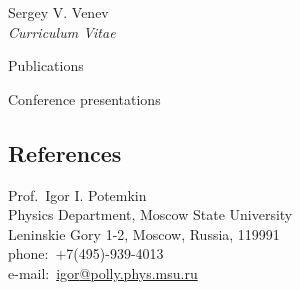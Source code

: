 \documentclass[10pt]{article}
\begin{document}
\begin{cv}{Sergey V. Venev\\{\large \itshape Curriculum Vitae}}
\begin{cvlist}{Publications}
\end{cvlist}
\begin{cvlist}{Conference presentations}
    \item
\end{cvlist}
\setlength{\cvlabelwidth}{\oldcvlabelwidth}
   

%     
%     



\subsection*{References}
\noindent\makebox[\linewidth]{\rule{\textwidth}{0.5pt}}
\vspace{0.1\baselineskip}
\begin{paracol}{3}

    Prof.\ Igor I. Potemkin\\
    Physics Department, Moscow State University\\
    Leninskie Gory 1-2, Moscow, Russia, 119991\\
    phone:\ +7(495)-939-4013\\
    e-mail:\ \href{mailto:igor@polly.phys.msu.ru}{igor\textrm{@}polly.phys.msu.ru}


\end{paracol}
\end{cv}
\end{document}
